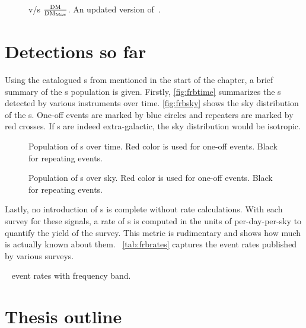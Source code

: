 \begin{figure}
\label{fig:dmdmax}
\caption{\dm v/s $\frac{\rm DM}{{\rm DM}_{\rm Max}}$. An updated version of~\cite{petroff_survey, palfa_frb}.}
\end{figure}

\par 

\section{Detections so far}

\par Using the catalogued \frb{}s from  mentioned in the start of the chapter, a brief summary of the \frb{}s population is given.
Firstly, \autoref{fig:frbtime} summarizes the \frb{}s detected by various instruments over time. \autoref{fig:frbsky} shows the sky distribution of the \frb{}s. One-off events are marked by blue circles and repeaters are marked by red crosses. If \frb{}s are indeed extra-galactic, the sky distribution would be isotropic.

\begin{figure}
	\label{fig:frbtime}
	\caption{Population of \frb{}s over time. Red color is used for one-off events. Black for repeating events.}
\end{figure}

\begin{figure}
	\label{fig:frbsky}
	\caption{Population of \frb{}s over sky. Red color is used for one-off events. Black for repeating events.}
\end{figure}

\par Lastly, no introduction of \frb{}s is complete without rate calculations. With each survey for these signals, a rate of \frb{}s is computed in the units of per-day-per-sky to quantify the yield of the survey. This metric is rudimentary and shows how much is actually known about them. ~\autoref{tab:frbrates} captures the event rates published by various surveys.

\begin{table}
	\label{tab:frbrates}
	\caption{\frb{}~ event rates with frequency band.}

\end{table}

\section{Thesis outline}


